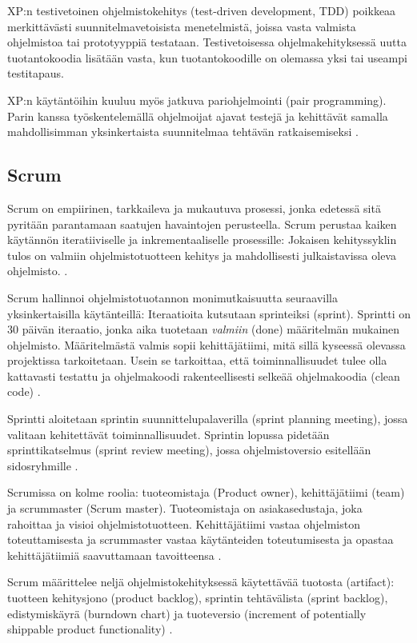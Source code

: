 \documentclass[finnish]{tktltiki2}
\theoremstyle{definition}
\theoremstyle{remark}
\begin{document}
XP:n testivetoinen ohjelmistokehitys (test-driven development, TDD) poikkeaa merkittävästi suunnitelmavetoisista menetelmistä, joissa vasta valmista ohjelmistoa tai prototyyppiä testataan. Testivetoisessa ohjelmakehityksessä uutta tuotantokoodia lisätään vasta, kun tuotantokoodille on olemassa yksi tai useampi testitapaus.

XP:n käytäntöihin kuuluu myös jatkuva pariohjelmointi (pair programming). Parin kanssa työskentelemällä ohjelmoijat ajavat testejä ja kehittävät samalla mahdollisimman yksinkertaista suunnitelmaa tehtävän ratkaisemiseksi \cite{BEC99}.

\subsection{Scrum}

Scrum on empiirinen, tarkkaileva ja mukautuva prosessi, jonka edetessä sitä pyritään parantamaan saatujen havaintojen perusteella. Scrum perustaa kaiken käytännön iteratiiviselle ja inkrementaaliselle prosessille: Jokaisen kehityssyklin tulos on valmiin ohjelmistotuotteen kehitys ja mahdollisesti julkaistavissa oleva ohjelmisto. \cite{SCH09}.

Scrum hallinnoi ohjelmistotuotannon monimutkaisuutta seuraavilla yksinkertaisilla käytänteillä: Iteraatioita kutsutaan sprinteiksi (sprint). Sprintti on 30 päivän iteraatio, jonka aika tuotetaan \textit{valmiin} (done) määritelmän mukainen ohjelmisto. Määritelmästä valmis sopii kehittäjätiimi, mitä sillä kyseessä olevassa projektissa tarkoitetaan. Usein se tarkoittaa, että toiminnallisuudet tulee olla kattavasti testattu ja ohjelmakoodi rakenteellisesti selkeää ohjelmakoodia (clean code) \cite{SCH09}. 

Sprintti aloitetaan sprintin suunnittelupalaverilla (sprint planning meeting), jossa valitaan kehitettävät toiminnallisuudet. Sprintin lopussa pidetään sprinttikatselmus (sprint review meeting), jossa ohjelmistoversio esitellään sidosryhmille \cite{SCH09}.

Scrumissa on kolme roolia: tuoteomistaja (Product owner), kehittäjätiimi (team) ja scrummaster (Scrum master). Tuoteomistaja on asiakasedustaja, joka rahoittaa ja visioi ohjelmistotuotteen. Kehittäjätiimi vastaa ohjelmiston toteuttamisesta ja scrummaster vastaa käytänteiden toteutumisesta ja opastaa kehittäjätiimiä saavuttamaan tavoitteensa \cite{SCH09}.

Scrum määrittelee neljä ohjelmistokehityksessä käytettävää tuotosta (artifact): tuotteen kehitysjono (product backlog), sprintin tehtävälista (sprint backlog), edistymiskäyrä (burndown chart) ja tuoteversio (increment of potentially shippable product functionality) \cite{SCH09}.
\end{document}
